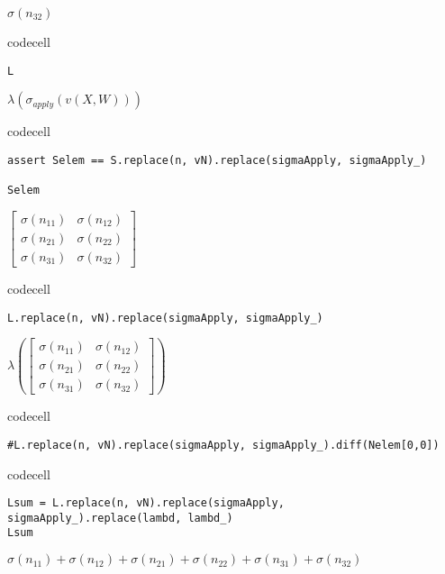 $\displaystyle \sigma{\left(n_{32} \right)}$

codecell

\begin{verbatim}
L
\end{verbatim}

$\displaystyle \lambda{\left(\sigma_{apply}{\left(v{\left(X,W \right)} \right)} \right)}$

codecell

\begin{verbatim}
assert Selem == S.replace(n, vN).replace(sigmaApply, sigmaApply_)

Selem
\end{verbatim}

$\displaystyle \left[\begin{matrix}\sigma{\left(n_{11} \right)} & \sigma{\left(n_{12} \right)}\\\sigma{\left(n_{21} \right)} & \sigma{\left(n_{22} \right)}\\\sigma{\left(n_{31} \right)} & \sigma{\left(n_{32} \right)}\end{matrix}\right]$

codecell

\begin{verbatim}
L.replace(n, vN).replace(sigmaApply, sigmaApply_)
\end{verbatim}

$\displaystyle \lambda{\left(\left[\begin{matrix}\sigma{\left(n_{11} \right)} & \sigma{\left(n_{12} \right)}\\\sigma{\left(n_{21} \right)} & \sigma{\left(n_{22} \right)}\\\sigma{\left(n_{31} \right)} & \sigma{\left(n_{32} \right)}\end{matrix}\right] \right)}$

codecell

\begin{verbatim}
#L.replace(n, vN).replace(sigmaApply, sigmaApply_).diff(Nelem[0,0])
\end{verbatim}


codecell

\begin{verbatim}
Lsum = L.replace(n, vN).replace(sigmaApply, sigmaApply_).replace(lambd, lambd_)
Lsum
\end{verbatim}

$\displaystyle \sigma{\left(n_{11} \right)} + \sigma{\left(n_{12} \right)} + \sigma{\left(n_{21} \right)} + \sigma{\left(n_{22} \right)} + \sigma{\left(n_{31} \right)} + \sigma{\left(n_{32} \right)}$

